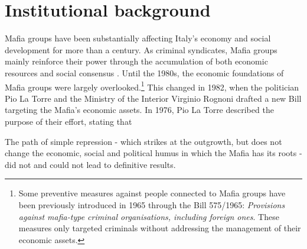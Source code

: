 \documentclass[12pt]{article}
\theoremstyle{plain}
\theoremstyle{plain}
\theoremstyle{plain}
\theoremstyle{definition}
\theoremstyle{plain}
\theoremstyle{definition}
\theoremstyle{plain}
\theoremstyle{remark}
\theoremstyle{definition}
\theoremstyle{definition}
\theoremstyle{plain}
\begin{document}
\section{Institutional background}
\label{sec:jmp_inst_bg}
Mafia groups have been substantially affecting Italy's economy and social development for more than a century. As criminal syndicates, Mafia groups mainly reinforce their power through the accumulation of both economic resources and social consensus \citep{sciarrone_il_1998}. 
Until the 1980s, the economic foundations of Mafia groups were largely overlooked.\footnote{Some preventive measures against people connected to Mafia groups have been previously introduced in 1965 through the Bill 575/1965: \emph{Provisions against mafia-type criminal organisations, including foreign ones}. These measures only targeted criminals without addressing the management of their economic assets.} This changed in 1982, when the politician Pio La Torre and the Ministry of the Interior Virginio Rognoni drafted a new Bill targeting the Mafia's economic assets. In 1976, Pio La Torre  described the purpose of their effort, stating that \par
\vspace{0.3cm}
\small %
The path of simple repression - which strikes at the outgrowth, but does not change the economic, social and political humus in which the Mafia has its roots - did not and could not lead to definitive results.
\vspace{0.3cm}
\end{document}
